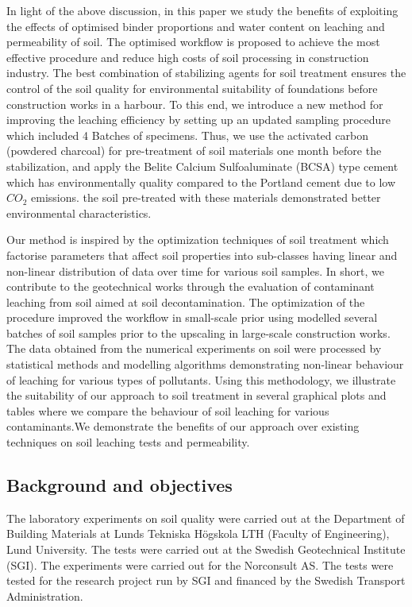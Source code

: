 \documentclass[algorithms,article,submit,pdftex,moreauthors]{Definitions/mdpi}
\begin{document}
In light of the above discussion, in this paper we study the benefits of exploiting the effects of optimised binder proportions and water content on leaching and permeability of soil. The optimised workflow is proposed to achieve the most effective procedure and reduce high costs of soil processing in construction industry. The best combination of stabilizing agents for soil treatment ensures the control of the soil quality for environmental suitability of foundations before construction works in a harbour. To this end, we introduce a new method for improving the leaching efficiency by setting up an updated sampling procedure which included 4 Batches of specimens. Thus, we use the activated carbon (powdered charcoal) for pre-treatment of soil materials one month before the stabilization, and apply the Belite Calcium Sulfoaluminate (BCSA) type cement which has environmentally quality compared to the Portland cement due to low $CO_2$ emissions. the soil pre-treated with these materials demonstrated better environmental characteristics. 

Our method is inspired by the optimization techniques of soil treatment \cite{Lindh2001,geotechnics2010005,RehmanMoghal,Yin,Kennedy} which factorise parameters that affect soil properties into sub-classes having linear and non-linear distribution of data over time for various soil samples. In short, we contribute to the geotechnical works through the evaluation of contaminant leaching from soil aimed at soil decontamination. The optimization of the procedure improved the workflow in small-scale prior using modelled several batches of soil samples prior to the upscaling in large-scale construction works. The data obtained from the numerical experiments on soil were processed by statistical methods and modelling algorithms demonstrating non-linear behaviour of leaching for various types of pollutants. Using this methodology, we illustrate the suitability of our approach to soil treatment in several graphical plots and tables where we compare the behaviour of soil leaching for various contaminants.We demonstrate the benefits of our approach over existing techniques on soil leaching tests and permeability.

\subsection{Background and objectives}

The laboratory experiments on soil quality were carried out at the Department of Building Materials at Lunds Tekniska Högskola LTH (Faculty of Engineering), Lund University. The tests were carried out at the Swedish Geotechnical Institute (SGI). The experiments were carried out for the Norconsult AS. The tests were tested for the research project run by SGI and financed by the Swedish Transport Administration. 
\end{document}
